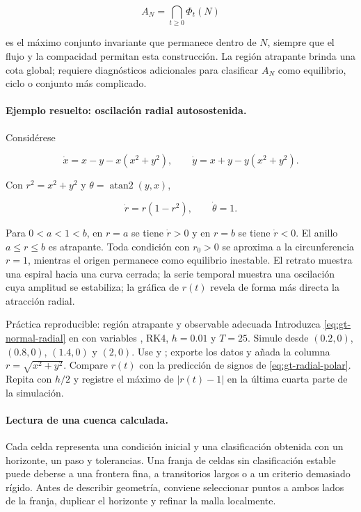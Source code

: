 \begin{equation}
 A_N=\bigcap_{t\geq0}\Phi_t(N)
 \label{eq:gt-maximo-invariante}
\end{equation}

es el máximo conjunto invariante que permanece dentro de $N$, siempre que el flujo y
la compacidad permitan esta construcción. La región atrapante brinda una cota global;
requiere diagnósticos adicionales para clasificar $A_N$ como equilibrio, ciclo o conjunto más
complicado.

\paragraph{Ejemplo resuelto: oscilación radial autosostenida.}
Considérese

\begin{equation}
 \dot x=x-y-x(x^2+y^2),\qquad
 \dot y=x+y-y(x^2+y^2).
 \label{eq:gt-normal-radial}
\end{equation}

Con $r^2=x^2+y^2$ y $\theta=\operatorname{atan2}(y,x)$,

\begin{equation}
 \dot r=r(1-r^2),\qquad \dot\theta=1.
 \label{eq:gt-radial-polar}
\end{equation}

Para $0<a<1<b$, en $r=a$ se tiene $\dot r>0$ y en $r=b$ se tiene
$\dot r<0$. El anillo $a\leq r\leq b$ es atrapante. Toda condición con $r_0>0$
se aproxima a la circunferencia $r=1$, mientras el origen permanece como equilibrio
inestable. El retrato muestra una espiral hacia una curva cerrada; la serie temporal
muestra una oscilación cuya amplitud se estabiliza; la gráfica de $r(t)$ revela de
forma más directa la atracción radial.

\begin{activitybox}{Práctica reproducible: región atrapante y observable adecuada}
Introduzca \eqref{eq:gt-normal-radial} en  con variables
, RK4, $h=0.01$ y $T=25$. Simule desde $(0.2,0)$, $(0.8,0)$,
$(1.4,0)$ y $(2,0)$. Use  y ; exporte
los datos y añada la columna $r=\sqrt{x^2+y^2}$. Compare $r(t)$ con la predicción
de signos de \eqref{eq:gt-radial-polar}. Repita con $h/2$ y registre el máximo de
$|r(t)-1|$ en la última cuarta parte de la simulación.
\end{activitybox}

\paragraph{Lectura de una cuenca calculada.}
Cada celda representa una condición inicial y una clasificación obtenida con un
horizonte, un paso y tolerancias. Una franja de celdas sin clasificación estable puede
deberse a una frontera fina, a transitorios largos o a un criterio demasiado rígido.
Antes de describir geometría, conviene seleccionar puntos a ambos lados de la franja,
duplicar el horizonte y refinar la malla localmente.

